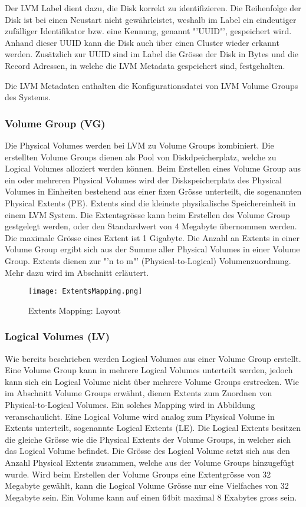 Der LVM Label dient dazu, die Disk korrekt zu identifizieren. Die Reihenfolge der Disk ist bei einen Neustart nicht gewährleistet, weshalb im Label ein eindeutiger zufälliger Identifikator bzw. eine Kennung, genannt "'UUID"', gespeichert wird. Anhand dieser UUID kann die Disk auch über einen Cluster wieder erkannt werden. 
Zusätzlich zur UUID sind im Label die Grösse der Disk in Bytes und die Record Adressen, in welche die LVM Metadata gespeichert sind, festgehalten.

Die LVM Metadaten enthalten die Konfigurationsdatei von LVM Volume Groups des Systems.

\subsubsection{Volume Group (VG)}\label{Volume Group (VG)}
Die Physical Volumes werden bei LVM zu Volume Groups kombiniert. Die erstellten Volume Groups dienen als Pool von Diskdpeicherplatz, welche zu Logical Volumes alloziert werden können. 
Beim Erstellen eines Volume Group aus ein oder mehreren Physical Volumes wird der Diskspeicherplatz des Physical Volumes in Einheiten bestehend aus einer fixen Grösse unterteilt, die sogenannten Physical Extents (PE).
Extents sind die kleinste physikalische Speichereinheit in einem LVM System. Die Extentsgrösse kann beim Erstellen des Volume Group gestgelegt werden, oder den Standardwert von 4 Megabyte übernommen werden. Die maximale Grösse eines Extent ist 1 Gigabyte. Die Anzahl an Extents in einer Volume Group ergibt sich aus der Summe aller Physical Volumes in einer Volume Group. Extents dienen zur "'n to m"' (Physical-to-Logical) Volumenzuordnung. Mehr dazu wird im Abschnitt  erläutert.

\begin{figure}[htb]
\centering
\texttt{[image: ExtentsMapping.png]}
\caption{Extents Mapping: Layout}
\label{fig:ExtentsMappingLayout}
\end{figure}

\subsubsection{Logical Volumes (LV)}\label{Logical Volumes (LV)}
Wie bereits beschrieben werden Logical Volumes aus einer Volume Group erstellt. Eine Volume Group kann in mehrere Logical Volumes unterteilt werden, jedoch kann sich ein Logical Volume nicht über mehrere Volume Groups erstrecken.
Wie im Abschnitt Volume Groups erwähnt, dienen Extents zum Zuordnen von Physical-to-Logical Volumes. Ein solches Mapping wird in Abbildung  veranschaulicht.
Eine Logical Volume wird analog zum Physical Volume in Extents unterteilt, sogenannte Logical Extents (LE).
Die Logical Extents besitzen die gleiche Grösse wie die Physical Extents der Volume Groups, in welcher sich das Logical Volume befindet. Die Grösse des Logical Volume setzt sich aus den Anzahl Physical Extents zusammen, welche aus der Volume Groups hinzugefügt wurde. Wird beim Erstellen der Volume Groups eine Extentgrösse von 32 Megabyte gewählt, kann die Logical Volume Grösse nur eine Vielfaches von 32 Megabyte sein. Ein Volume kann auf einen 64bit maximal 8 Exabytes gross sein. 

